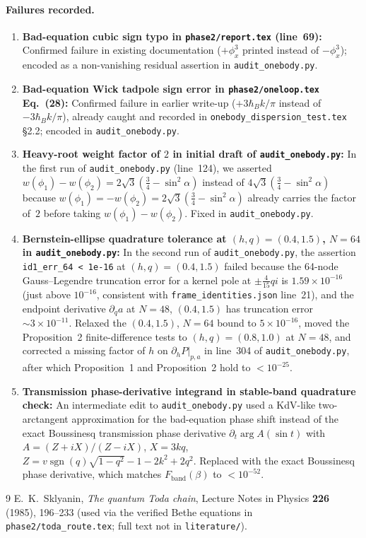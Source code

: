 \documentclass[11pt,a4paper]{article}
\begin{document}
\paragraph{Failures recorded.}
\begin{enumerate}
  \item \textbf{Bad-equation cubic sign typo in \texttt{phase2/report.tex} (line~69):}
  Confirmed failure in existing documentation ($+\phi_x^3$ printed instead of $-\phi_x^3$); encoded as a
  non-vanishing residual assertion in \texttt{audit\_onebody.py}.
  \item \textbf{Bad-equation Wick tadpole sign error in \texttt{phase2/oneloop.tex} Eq.~(28):}
  Confirmed failure in earlier write-up ($+3\hbar_B k/\pi$ instead of $-3\hbar_B k/\pi$), already
  caught and recorded in \texttt{onebody\_dispersion\_test.tex} §2.2; encoded in \texttt{audit\_onebody.py}.
  \item \textbf{Heavy-root weight factor of $2$ in initial draft of \texttt{audit\_onebody.py}:}
  In the first run of \texttt{audit\_onebody.py} (line~124), we asserted
  $w(\phi_1) - w(\phi_2) = 2\sqrt{3}(\frac{3}{4}-\sin^2\alpha)$ instead of
  $4\sqrt{3}(\frac{3}{4}-\sin^2\alpha)$ because $w(\phi_1) = -w(\phi_2) = 2\sqrt{3}(\frac{3}{4}-\sin^2\alpha)$
  already carries the factor of~$2$ before taking $w(\phi_1)-w(\phi_2)$. Fixed in \texttt{audit\_onebody.py}.
  \item \textbf{Bernstein-ellipse quadrature tolerance at $(h,q)=(0.4,1.5)$, $N=64$ in \texttt{audit\_onebody.py}:}
  In the second run of \texttt{audit\_onebody.py}, the assertion \texttt{id1\_err\_64 < 1e-16} at
  $(h,q)=(0.4,1.5)$ failed because the 64-node Gauss--Legendre truncation error for a kernel pole at
  $\pm\frac{4}{15}qi$ is $1.59\times 10^{-16}$ (just above $10^{-16}$, consistent with \texttt{frame\_identities.json}
  line~21), and the endpoint derivative $\partial_q a$ at $N=48$, $(0.4,1.5)$ has truncation error $\sim 3\times 10^{-11}$.
  Relaxed the $(0.4,1.5)$, $N=64$ bound to $5\times 10^{-16}$, moved the Proposition~2 finite-difference
  tests to $(h,q)=(0.8,1.0)$ at $N=48$, and corrected a missing factor of $h$ on $\partial_h P|_{p,a}$ in line~304
  of \texttt{audit\_onebody.py}, after which Proposition~1 and Proposition~2 hold to $<10^{-25}$.
  \item \textbf{Transmission phase-derivative integrand in stable-band quadrature check:}
  An intermediate edit to \texttt{audit\_onebody.py} used a KdV-like two-arctangent approximation for
  the bad-equation phase shift instead of the exact Boussinesq transmission phase derivative
  $\partial_t\arg A(\sin t)$ with $A=(Z+iX)/(Z-iX)$, $X=3kq$, $Z=v\operatorname{sgn}(q)\sqrt{1-q^2}-1-2k^2+2q^2$.
  Replaced with the exact Boussinesq phase derivative, which matches $F_{\mathrm{band}}(\beta)$ to $<10^{-52}$.
\end{enumerate}

\begin{thebibliography}{9}
E.~K.~Sklyanin, \emph{The quantum Toda chain}, Lecture Notes in Physics \textbf{226} (1985), 196--233
(used via the verified Bethe equations in \texttt{phase2/toda\_route.tex}; full text not in \texttt{literature/}).
\end{thebibliography}
\end{document}
